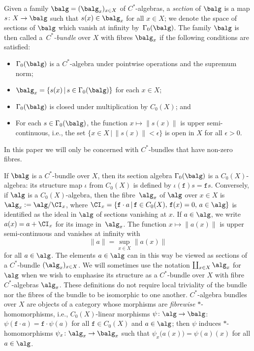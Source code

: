 Given a family $\balg=(\balg_x)_{x\in X}$ of $C^*$-algebras, a
\emph{section} of $\balg$ is
a map $s\colon X\to\balg$ such that $s(x)\in\balg_x$ for all $x\in X$; we
denote the space of sections of $\balg$ which vanish at infinity by~$\Gamma_0(\balg)$. The family $\balg$ is then called a~\emph{$C^*$-bundle} over $X$ with fibres $\balg_x$ if the following
conditions are satisfied:
\begin{itemize}\itemsep=0pt
\item
$\Gamma_0(\balg)$ is a $C^*$-algebra under pointwise operations and the
 supremum norm;
\item $\balg_x=\{s(x)\, |\, s\in\Gamma_0(\balg)\}$ for each
 $x\in X$;
\item $\Gamma_0(\balg)$ is closed under multiplication by
 $C_0(X)$; and
\item For each $s\in\Gamma_0(\balg)$, the function $x\mapsto \|s(x)\|$
is upper semi-continuous, i.e., the set
$\{x\in X \,|\, \|s(x)\|< \epsilon\}$ is open in $X$ for all $\epsilon>0$.
\end{itemize}
In this
paper we will only be concerned with $C^*$-bundles that have non-zero fibres.

If $\balg$ is a $C^*$-bundle over $X$, then its section algebra
$\Gamma_0(\balg)$ is a $C_0(X)$-algebra: its structure map $\iota$ from
$C_0(X)$ is defined by $\iota(\mathtt{f})s=\mathtt{f} s$. Conversely, if $\alg$ is a
$C_0(X)$-algebra, then the fibre~$\alg_x$ of $\alg$ over $x\in X$ is $\alg_x:=\alg/\CI_x$, where
$\CI_x=\{\mathtt{f}\cdot a\, |\, \mathtt{f}\in C_0(X) , \,
\mathtt{f}(x)=0 , \, a\in\alg\}$ is identified as the ideal in
$\alg$ of sections vanishing at $x$. If
$a\in\alg$, we write $a(x)=a+\CI_x$ for its image in~$\alg_x$. The
function $x\mapsto\|a(x)\|$ is upper semi-continuous
and vanishes at infinity with
\[
\|a\| = \sup_{x\in X} \big\|a(x)\big\|
\]
for all $a\in\alg$. The
elements $a\in \alg$ can in this way be viewed as sections of a
$C^*$-bundle $(\alg_x)_{x\in X}$. We will sometimes use the
notation $\coprod_{x\in X} \alg_x$ for $\alg$ when we wish to emphasise
its structure as a $C^*$-bundle over $X$ with fibre $C^*$-algebras
$\alg_x$. These definitions do not require
local triviality of the bundle nor the fibres of the bundle to be
isomorphic to one another. $C^*$-algebra bundles over $X$ are objects of a
category whose morphisms are \emph{fibrewise} $*$-homomorphisms,
i.e., $C_0(X)$-linear morphisms $\psi\colon \alg\to\balg$: $\psi(\mathtt{f}\cdot
a)=\mathtt{f}\cdot\psi(a)$ for all $\mathtt{f}\in C_0(X)$ and $a\in\alg$; then $\psi$
induces $*$-homomorphisms $\psi_x\colon \alg_x\to\balg_x$ such that
$\psi_x\big(a(x)\big)=\psi(a)(x)$ for all $a\in\alg$.

